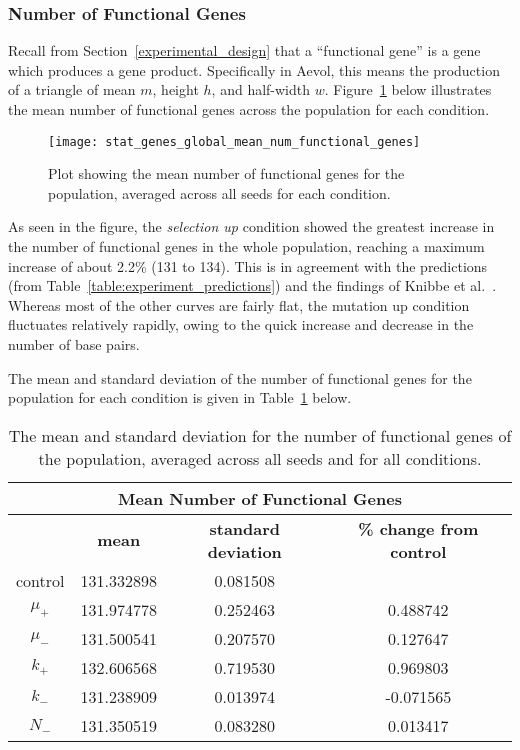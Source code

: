 \subsubsection{Number of Functional Genes}\label{sec:number_of_functional_genes}
Recall from Section~\ref{experimental_design} that a ``functional gene'' is a gene which produces a gene product. Specifically in Aevol, this means the production of a triangle of mean $m$, height $h$, and half-width $w$. Figure~\ref{fig:mean_num_functional_genes} below illustrates the mean number of functional genes across the population for each condition.  
\begin{figure}[H]
	\centering
	\texttt{[image: stat\_genes\_global\_mean\_num\_functional\_genes]}
	\caption[Mean number of functional genes]{Plot showing the mean number of functional genes for the population, averaged across all seeds for each condition.}
	\label{fig:mean_num_functional_genes}
\end{figure}
As seen in the figure, the \textit{selection up} condition showed the greatest increase in the number of functional genes in the whole population, reaching a maximum increase of about 2.2\% (131 to 134). This is in agreement with the predictions (from Table~\ref{table:experiment_predictions}) and the findings of Knibbe et al.~\cite{Knibbe2007}. Whereas most of the other curves are fairly flat, the mutation up condition fluctuates relatively rapidly, owing to the quick increase and decrease in the number of base pairs. 

The mean and standard deviation of the number of functional genes for the population for each condition is given in Table~\ref{table:number_of_genes_mean_std_dev} below.

\begin{table}[H]
	\centering
	\begin{tabular}{|c|c|c|c|}
		\hline
		\multicolumn{4}{c}{\Large \textbf{Mean Number of Functional Genes}} \\
		\hline
		& \textbf{mean} & \textbf{standard deviation} & \textbf{\% change from control} \\
		\hline
		control & 131.332898 & 0.081508 & \textemdash \\ 
		\hline
		$\mu_+$ & 131.974778 & 0.252463 & 0.488742 \\ 
		\hline
		$\mu_-$ & 131.500541 & 0.207570 & 0.127647 \\ 
		\hline
		$k_+$ & 132.606568 & 0.719530 & 0.969803 \\ 
		\hline
		$k_-$ & 131.238909 & 0.013974 & -0.071565 \\ 
		\hline
		$N_-$ & 131.350519 & 0.083280 & 0.013417 \\ 
		\hline
	\end{tabular}
	\caption[Number of functional genes - mean and standard deviation]{The mean and standard deviation for the number of functional genes of the population, averaged across all seeds and for all conditions.}
	\label{table:number_of_genes_mean_std_dev}
\end{table}

